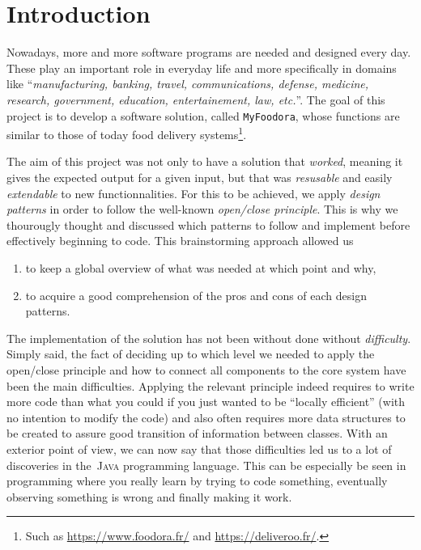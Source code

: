 \section{Introduction} %
\label{sec:introduction}
Nowadays, more and more software programs are needed and designed every day.
These play an important role in everyday life and more specifically
in domains like ``\textit{manufacturing, banking, travel, communications,
defense, medicine, research, government, education, entertainement,
law, etc.}''\cite[p.6]{long2008critical}.
The goal of this project is to develop a software solution,
called \lstinline|MyFoodora|, whose functions are similar to those
of today food delivery systems\footnote{Such as \url{https://www.foodora.fr/}
and \url{https://deliveroo.fr/}.}.

The aim of this project was not only to have a solution that \emph{worked},
meaning it gives the expected output for a given input,
but that was \emph{resusable} and easily \emph{extendable} to new functionnalities.
For this to be achieved, we apply \emph{design patterns} in order
to follow the well-known \emph{open/close principle}.
This is why we thourougly thought and discussed which patterns to follow
and implement before effectively beginning to code.
This brainstorming approach allowed us
\begin{enumerate}
  \item to keep a global overview of what was needed at which point and why,
  \item to acquire a good comprehension of the pros and cons of each
  design patterns.
\end{enumerate}

The implementation of the solution has not been without done without \emph{difficulty}.
Simply said, the fact of deciding up to which level we needed to apply the
open/close principle and how to connect all components to the core system
have been the main difficulties.
Applying the relevant principle indeed requires to write more code than 
what you could if you just wanted to be ``locally efficient'' (with no 
intention to modify the code) and also often requires more data structures
to be created to assure good transition of information between classes.
With an exterior point of view, we can now say that those difficulties
led us to a lot of discoveries in the~\textsc{Java} programming language.
This can be especially be seen in programming where you really learn
by trying to code something, eventually observing something is wrong
and finally making it work.

